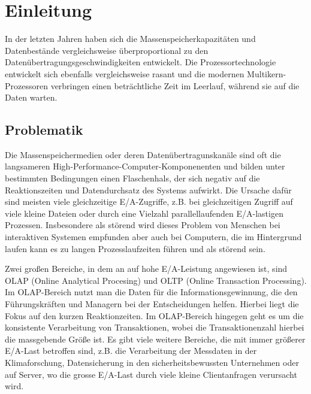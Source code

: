 
\section{Einleitung}
In der letzten Jahren haben sich die Massenspeicherkapazitäten und Datenbestände vergleichsweise überproportional zu den Datenübertragungsgeschwindigkeiten entwickelt. Die Prozessortechnologie entwickelt sich ebenfalls vergleichsweise rasant und die modernen Multikern-Prozessoren verbringen einen beträchtliche Zeit im Leerlauf, während sie auf die Daten warten.


\subsection{Problematik}
Die Massenspeichermedien oder deren Datenübertragunskanäle sind oft die langsameren High-Performance-Computer-Komponenenten und bilden unter bestimmten Bedingungen einen Flaschenhals, der sich negativ auf die Reaktionszeiten und Datendurchsatz des Systems aufwirkt. Die Ursache dafür sind meisten viele gleichzeitige E/A-Zugriffe, z.B. bei gleichzeitigen Zugriff auf viele kleine Dateien oder durch eine Vielzahl parallellaufenden E/A-lastigen Prozessen. Insbesondere als störend wird dieses Problem von Menschen bei interaktiven Systemen empfunden aber auch bei Computern, die im Hintergrund laufen kann es zu langen Prozesslaufzeiten führen und als störend sein.

Zwei großen Bereiche, in dem an auf hohe E/A-Leistung angewiesen ist, sind OLAP (Online Analytical Procesing) und OLTP (Online Transaction Processing). Im OLAP-Bereich nutzt man die Daten für die Informationsgewinnung, die den Führungskräften und Managern bei der Entscheidungen helfen. Hierbei liegt die Fokus auf den kurzen Reaktionzeiten. Im OLAP-Bereich hingegen geht es um die konsistente Verarbeitung von Transaktionen, wobei die Transaktionenzahl hierbei die massgebende Größe ist. Es gibt viele weitere Bereiche, die mit immer größerer E/A-Last betroffen sind, z.B. die Verarbeitung der Messdaten in der Klimaforschung, Datensicherung in den sicherheitsbewussten Unternehmen oder auf Server, wo die grosse E/A-Last durch viele kleine Clientanfragen verursacht wird.


